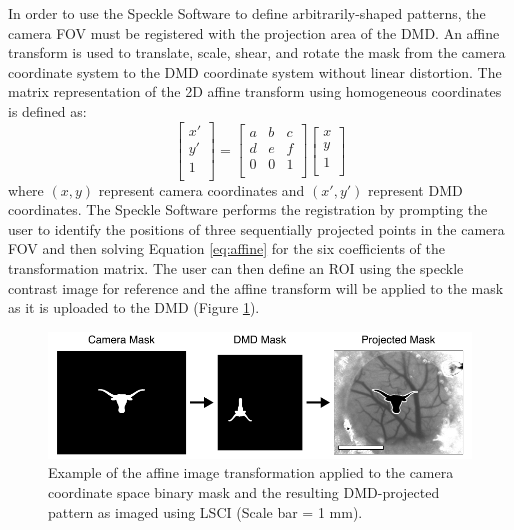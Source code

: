 In order to use the Speckle Software to define arbitrarily-shaped patterns, the camera FOV must be registered with the projection area of the DMD. An affine transform is used to translate, scale, shear, and rotate the mask from the camera coordinate system to the DMD coordinate system without linear distortion. The matrix representation of the 2D affine transform using homogeneous coordinates is defined as:
%
\begin{equation}
    \label{eq:affine}
    \begin{bmatrix}
        x' \\
        y' \\
        1  \\
    \end{bmatrix}
    =
    \begin{bmatrix}
        a & b & c \\
        d & e & f \\
        0 & 0 & 1 \\
    \end{bmatrix}
    \begin{bmatrix}
        x \\
        y \\
        1 \\
    \end{bmatrix}
\end{equation}
%
where $(x,y)$ represent camera coordinates and $(x',y')$ represent DMD coordinates. The Speckle Software performs the registration by prompting the user to identify the positions of three sequentially projected points in the camera FOV and then solving Equation \ref{eq:affine} for the six coefficients of the transformation matrix. The user can then define an ROI using the speckle contrast image for reference and the affine transform will be applied to the mask as it is uploaded to the DMD (Figure \ref{fig:dmdregistration}).

\begin{figure}
    \includegraphics{figures/chapter_2/dmdregistration.pdf}
    \caption {
        \label{fig:dmdregistration}
        Example of the affine image transformation applied to the camera coordinate space binary mask and the resulting DMD-projected pattern as imaged using LSCI (Scale bar = 1 mm).
    }
\end{figure}

